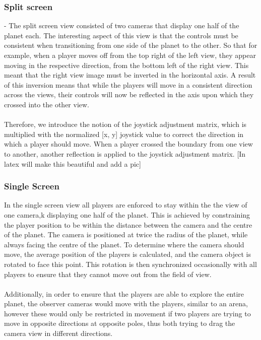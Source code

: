 \documentclass[11pt,a4paper]{article}
\begin{document}
   \subsubsection{Split screen} 
   - The split screen view consisted of two cameras that display one half of the planet each. The interesting aspect of this view is that the controls must be consistent when transitioning from one side of the planet to the other. So that for example, when a player moves off from the top right of the left view, they appear moving in the respective direction, from the bottom left of the right view. This meant that the right view image must be inverted in the horizontal axis. A result of this inversion means that while the players will move in a consistent direction across the views, their controls will now be reflected in the axis upon which they crossed into the other view. \\ \\
   Therefore, we introduce the notion of the joystick adjustment matrix, which is multiplied with the normalized [x, y] joystick value to correct the direction in which a player should move. When a player crossed the boundary from one view to another, another reflection is applied to the joystick adjustment matrix. [In latex will make this beautiful and add a pic]
   \subsubsection{Single Screen}
    In the single screen view all players are enforced to stay within the the view of one camera,k displaying one half of the planet. This is achieved by constraining the player position to be within the distance between the camera and the centre of the planet. The camera is positioned at twice the radius of the planet, while always facing the centre of the planet. To determine where the camera should move, the average position of the players is calculated, and the camera object is rotated to face this point. This rotation is then synchronized occasionally with all players to ensure that they cannot move out from the field of view. \\ \\
    Additionally, in order to ensure that the players are able to explore the entire planet, the observer cameras would move with the players, similar to an arena, however these would only be restricted in movement if two players are trying to move in opposite directions at opposite poles, thus both trying to drag the camera view in different directions.
\end{document}
